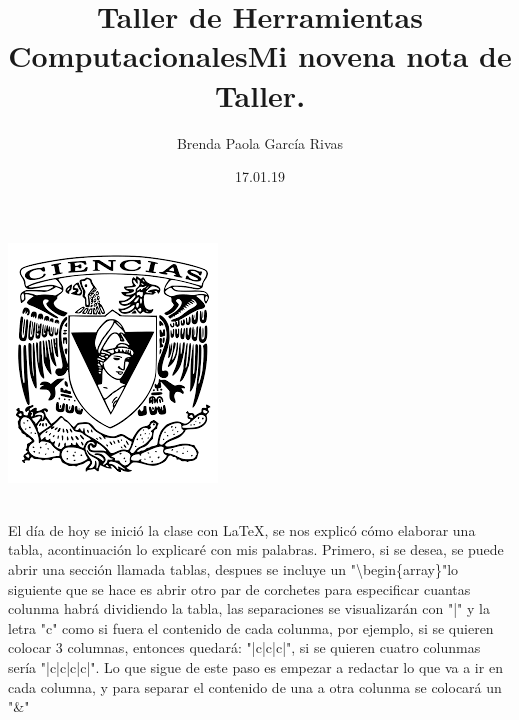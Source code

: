 \documentclass{article}
\title{\huge \color{red}Taller de Herramientas Computacionales}
\author{Brenda Paola García Rivas}
\date{17.01.19}
\begin{document}
\maketitle
\begin{center}
	\includegraphics[scale=1.30]{1.png}
\end{center}
\newpage
\title{\huge Mi novena nota de Taller.}\\

El día de hoy se inició la clase con LaTeX, se nos explicó cómo elaborar una tabla, acontinuación lo explicaré con mis palabras. Primero, si se desea, se puede abrir una sección llamada tablas, despues se incluye un "\textbackslash begin\{array\}"lo siguiente que se hace es abrir otro par de corchetes para especificar cuantas colunma habrá dividiendo la tabla, las separaciones se visualizarán con "|" y la letra "c" como si fuera el contenido de cada colunma, por ejemplo, si se quieren colocar 3 columnas, entonces quedará: "|c|c|c|", si se quieren cuatro colunmas sería "|c|c|c|c|".
Lo que sigue de este paso es empezar a redactar lo que va a ir en cada columna, y para separar el contenido de una a otra colunma se colocará un "\&"
\end{document}
